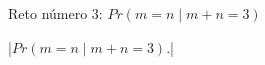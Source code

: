 

\bigskip

\enunciadoS Reto n\'umero 3: 
$Pr(m = n \mid m + n = 3)$

\bigskip

\respuestaS

|$Pr(m = n \mid m + n = 3)$.|

\bye

